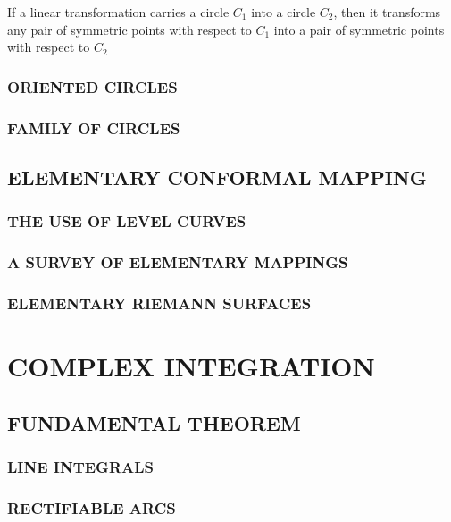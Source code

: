 \documentclass{report}
\begin{document}
\begin{theorem}
    If a linear transformation carries a circle $C_1$ into a circle $C_2$, then it transforms any pair of symmetric points with respect to $C_1$ into  a pair of symmetric points with respect to $C_2$
\end{theorem}

\subsection{ORIENTED CIRCLES}

\subsection{FAMILY OF CIRCLES}

\section{ELEMENTARY CONFORMAL MAPPING}

\subsection{THE USE OF LEVEL CURVES}

\subsection{A SURVEY OF ELEMENTARY MAPPINGS}

\subsection{ELEMENTARY RIEMANN SURFACES}

\chapter{COMPLEX INTEGRATION}

\section{FUNDAMENTAL THEOREM}

\subsection{LINE INTEGRALS}

\subsection{RECTIFIABLE ARCS}
\end{document}
